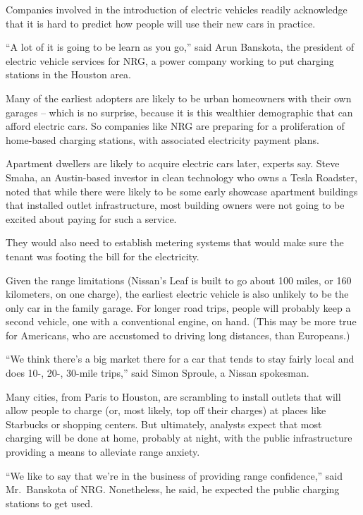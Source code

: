 ﻿\documentclass[12pt]{article}
\begin{document}
Companies involved in the introduction of electric vehicles readily acknowledge that it is hard to
predict how people will use their new cars in practice.

``A lot of it is going to be learn as you go,'' said Arun Banskota, the president of electric
vehicle services for NRG, a power company working to put charging stations in the Houston area.

Many of the earliest adopters are likely to be urban homeowners with their own garages -- which is
no surprise, because it is this wealthier demographic that can afford electric cars. So companies
like NRG are preparing for a proliferation of home-based charging stations, with associated
electricity payment plans.

Apartment dwellers are likely to acquire electric cars later, experts say. Steve Smaha, an
Austin-based investor in clean technology who owns a Tesla Roadster, noted that while there were
likely to be some early showcase apartment buildings that installed outlet infrastructure, most
building owners were not going to be excited about paying for such a service.

They would also need to establish metering systems that would make sure the tenant was footing the
bill for the electricity.

Given the range limitations (Nissan's Leaf is built to go about 100 miles, or 160 kilometers, on one
charge), the earliest electric vehicle is also unlikely to be the only car in the family garage. For
longer road trips, people will probably keep a second vehicle, one with a conventional engine, on
hand. (This may be more true for Americans, who are accustomed to driving long distances, than
Europeans.)

``We think there's a big market there for a car that tends to stay fairly local and does 10-, 20-,
30-mile trips,'' said Simon Sproule, a Nissan spokesman.

Many cities, from Paris to Houston, are scrambling to install outlets that will allow people to
charge (or, most likely, top off their charges) at places like Starbucks or shopping centers. But
ultimately, analysts expect that most charging will be done at home, probably at night, with the
public infrastructure providing a means to alleviate range anxiety.

``We like to say that we're in the business of providing range confidence,'' said Mr.~Banskota of
NRG. Nonetheless, he said, he expected the public charging stations to get used.
\end{document}
